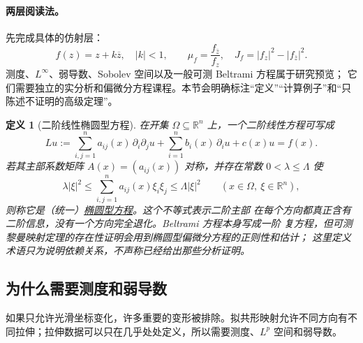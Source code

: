 \documentclass[UTF8,fontset=none,a4paper,11pt]{ctexart}
\theoremstyle{foundation-definition}
\newtheorem{definition}{定义}[section]
\theoremstyle{foundation-theorem}
\theoremstyle{foundation-proposition}
\theoremstyle{foundation-example}
\theoremstyle{foundation-remark}
\theoremstyle{foundation-theorem}
\newcommand{\term}[2]{\hyperref[#1]{#2}}
\begin{document}
\paragraph{两层阅读法。}
先完成具体的仿射层：
\[
f(z)=z+k\overline z,\quad |k|<1,
\qquad
\mu_f=\frac{f_{\bar z}}{f_z},\quad
J_f=|f_z|^2-|f_{\bar z}|^2.
\]
测度、\(L^\infty\)、弱导数、Sobolev 空间以及一般可测 Beltrami 方程属于研究预览；
它们需要独立的实分析和偏微分方程课程。本节会明确标注“定义”“计算例子”和“只陈述不证明的高级定理”。

\begin{definition}[二阶线性椭圆型方程]\label{def:elliptic-equation}
在开集 \(\Omega\subseteq\mathbb R^n\) 上，一个二阶线性方程可写成
\[
Lu:=\sum_{i,j=1}^n a_{ij}(x)\,\partial_i\partial_j u
   +\sum_{i=1}^n b_i(x)\,\partial_i u+c(x)u=f(x).
\]
若其主部系数矩阵 \(A(x)=(a_{ij}(x))\) 对称，并存在常数
\(0<\lambda\leq\Lambda\) 使
\[
\lambda|\xi|^2\leq \sum_{i,j=1}^n a_{ij}(x)\xi_i\xi_j
\leq\Lambda|\xi|^2
\qquad(x\in\Omega,\ \xi\in\mathbb R^n),
\]
则称它是（统一）\term{def:elliptic-equation}{椭圆型方程}。这个不等式表示二阶主部
在每个方向都真正含有二阶信息，没有一个方向完全退化。Beltrami 方程本身写成一阶
复方程，但可测黎曼映射定理的存在性证明会用到椭圆型偏微分方程的正则性和估计；
这里定义术语只为说明依赖关系，不声称已经给出那些分析证明。
\end{definition}

\subsection{为什么需要测度和弱导数}

如果只允许光滑坐标变化，许多重要的变形被排除。拟共形映射允许不同方向有不同拉伸；拉伸数据可以只在几乎处处定义，所以需要测度、\(L^p\) 空间和弱导数。
\end{document}
